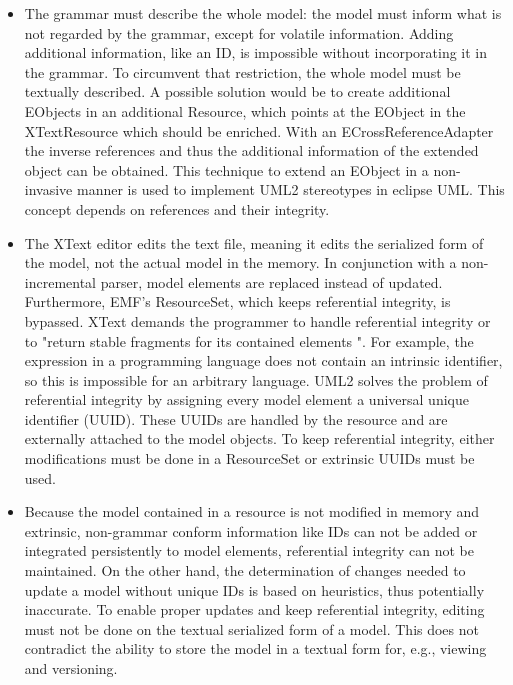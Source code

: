 \begin{itemize}
	\item The grammar must describe the whole model: the model must inform what is not regarded by the grammar, except for volatile information. Adding additional information, like an ID, is impossible without incorporating it in the grammar. To circumvent that restriction, the whole model must be textually described. A possible solution would be to create additional EObjects in an additional Resource, which points at the EObject in the XTextResource which should be enriched. With an ECrossReferenceAdapter the inverse references and thus the additional information of the extended object can be obtained. This technique to extend an EObject in a non-invasive manner is used to implement UML2 stereotypes in eclipse UML. This concept depends on references and their integrity.
	\item The XText editor edits the text file, meaning it edits the serialized form of the model, not the actual model in the memory. In conjunction with a non-incremental parser, model elements are replaced instead of updated. Furthermore, EMF's ResourceSet, which keeps referential integrity, is bypassed. XText demands the programmer to handle referential integrity or to "return stable fragments for its contained elements ". For example, the expression  in a programming language does not contain an intrinsic identifier, so this is impossible for an arbitrary language. UML2 solves the problem of referential integrity by assigning every model element a universal unique identifier (UUID). These UUIDs are handled by the resource and are  externally attached to the model objects. To keep referential integrity, either modifications must be done in a ResourceSet or extrinsic UUIDs must be used. 
	\item Because the model contained in a resource is not modified in memory and extrinsic, non-grammar conform information like IDs can not be added or integrated persistently to model elements, referential integrity can not be maintained. On the other hand, the determination of changes needed to update a model without unique IDs is based on heuristics, thus potentially inaccurate.  To enable proper updates and keep referential integrity, editing must not be done on the textual serialized form of a model. This does not contradict the ability to store the model in a textual form for, e.g., viewing and versioning. 
\end{itemize}

